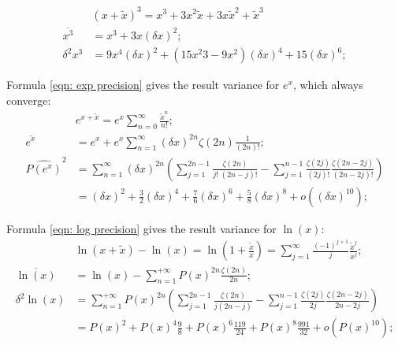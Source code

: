 \documentclass[twoside]{article}
\numberwithin{equation}{section}
\begin{document}
\begin{align*}
& (x + \tilde{x})^3 = x^3 + 3 x^2 \tilde{x} + 3 x \tilde{x}^2 + \tilde{x}^3 \\
\overline{x^3} &= x^3 + 3 x (\delta x)^2; \\
\delta^2 x^3 &= 9 x^4  (\delta x)^2 +  (15 x^2 3 - 9 x^2) (\delta x)^4 + 15 (\delta x)^6;
\end{align*}

\fi


Formula \eqref{eqn: exp precision} gives the result variance for $e^x$, which always converge:
\begin{align}
\label{eqn: exp Taylor}
& e^{x + \tilde{x}} = e^x \sum_{n=0}^{\infty} \frac{\tilde{x}^n}{n!}; \\
\overline{e^x} &= e^x + e^x \sum_{n=1}^{\infty} (\delta x)^{2n} \zeta(2n) \frac{1}{(2n)!}; \\
\label{eqn: exp precision}
\widehat{P(e^x)}^2 &= \sum_{n=1}^{\infty} (\delta x)^{2n}  \left( \sum_{j=1}^{2n-1} \frac{\zeta(2n)}{j!\;(2n - j)!} 
 -\sum_{j=1}^{n-1} \frac{\zeta(2j)}{(2j)!} \frac{\zeta(2n - 2j)}{(2n - 2j)!} \right) \\
 &= (\delta x)^2 + \frac{3}{2} (\delta x)^4 + \frac{7}{6} (\delta x)^6 + \frac{5}{8} (\delta x)^8 + o((\delta x)^{10});
\end{align}

Formula \eqref{eqn: log precision} gives the result variance for $\ln(x)$:
\begin{align}
\label{eqn: log Taylor}
& \ln(x + \tilde{x}) - \ln(x) = \ln(1 + \frac{\tilde{x}}{x}) = \sum_{j=1}^{\infty} \frac{(-1)^{j+1}}{j} \frac{\tilde{x}^j}{x^j}; \\
\overline{\ln(x)}  &= \ln(x) -\sum_{n=1}^{+\infty} P(x)^{2n} \frac{\zeta(2n)}{2n}; \\
\label{eqn: log precision}
\delta^2 \ln(x) &= \sum_{n=1}^{+\infty} P(x)^{2n} \left(\sum_{j=1}^{2n-1} \frac{\zeta(2n)}{j (2n-j)}
   - \sum_{j=1}^{n-1} \frac{\zeta(2j)}{2j} \frac{\zeta(2n - 2j)}{2n - 2j} \right) \\
 &= P(x)^2 + P(x)^4 \frac{9}{8}  + P(x)^6 \frac{119}{24} + P(x)^8 \frac{991}{32} + o(P(x)^{10}); 
\end{align}
\end{document}
